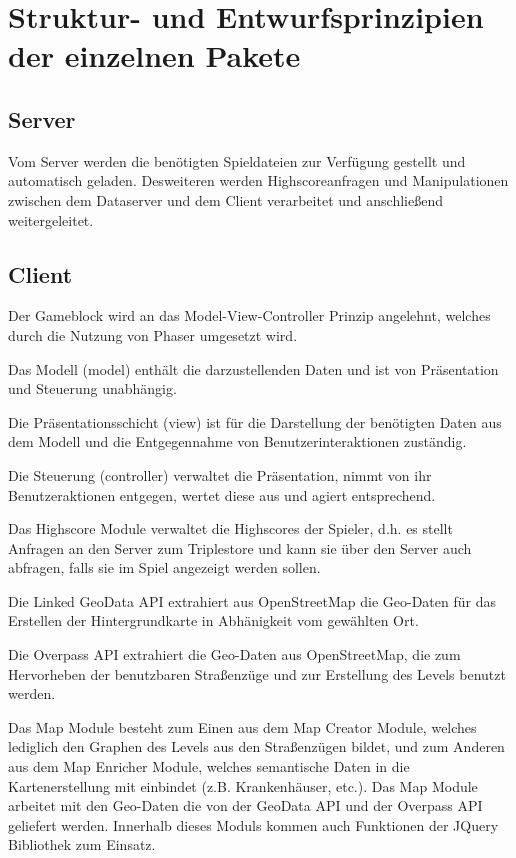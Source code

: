 \documentclass[11pt,a4paper]{article}
\begin{document}
\section{Struktur- und Entwurfsprinzipien der einzelnen Pakete}
\subsection{Server} Vom Server werden die benötigten Spieldateien zur Verfügung gestellt und automatisch geladen. Desweiteren werden Highscoreanfragen und Manipulationen zwischen dem Dataserver und dem Client verarbeitet und anschließend weitergeleitet.

\subsection{Client}
Der Gameblock wird an das Model-View-Controller Prinzip angelehnt, welches durch die Nutzung von Phaser umgesetzt wird. \bigskip

Das Modell (model) enthält die darzustellenden Daten und ist von Präsentation und Steuerung unabhängig.\bigskip

Die Präsentationsschicht (view) ist für die Darstellung der benötigten Daten aus dem Modell und die Entgegennahme von Benutzerinteraktionen zuständig.\bigskip

Die Steuerung (controller) verwaltet die Präsentation, nimmt von ihr Benutzeraktionen entgegen, wertet diese aus und agiert entsprechend.\bigskip

Das Highscore Module verwaltet die Highscores der Spieler, d.h. es stellt Anfragen an den Server zum Triplestore und kann sie über den Server auch abfragen, falls sie im Spiel angezeigt werden sollen.\bigskip

Die Linked GeoData API extrahiert aus OpenStreetMap die Geo-Daten für das Erstellen der Hintergrundkarte in Abhänigkeit vom gewählten Ort.\bigskip

Die Overpass API extrahiert die Geo-Daten aus OpenStreetMap, die zum Hervorheben der benutzbaren Straßenzüge und zur Erstellung des Levels benutzt werden.\bigskip

Das Map Module besteht zum Einen aus dem Map Creator Module, welches lediglich den Graphen des Levels aus den Straßenzügen bildet, und zum Anderen aus dem Map Enricher Module, welches semantische Daten in die Kartenerstellung mit einbindet (z.B. Krankenhäuser, etc.). Das Map Module arbeitet mit den Geo-Daten die von der GeoData API und der Overpass API geliefert werden.
Innerhalb dieses Moduls kommen auch Funktionen der  JQuery Bibliothek zum Einsatz.
\end{document}
